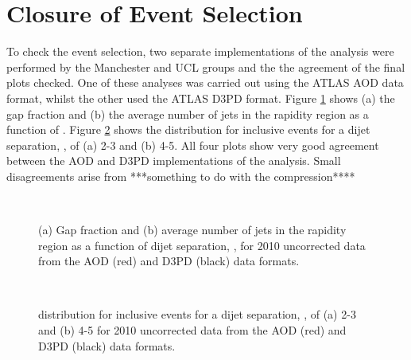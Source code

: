 \section{Closure of Event Selection}
\label{sec:GBJ2:AODD3PD}

To check the event selection, two separate implementations of the analysis were performed by the Manchester and UCL groups and the the agreement of the final plots checked.
One of these analyses was carried out using the ATLAS AOD data format, whilst the other used the ATLAS D3PD format.
Figure \ref{GBJ2:AODD3PD:gap_njet} shows (a) the  gap fraction and (b) the  average number of jets in the rapidity region as a function of \dy{}.
Figure \ref{GBJ2:AODD3PD:dphi} shows the \dphi{} distribution for inclusive events for a dijet separation, \dy{}, of (a) 2-3 and (b) 4-5. 
All four plots show very good agreement between the AOD and D3PD implementations of the analysis.
Small disagreements arise from ***something to do with the compression****


\begin{figure}
\centering
\mbox{
              \quad
              \quad
                              }
\caption[]{
(a) Gap fraction and (b) average number of jets in the rapidity region as a function of dijet separation, \dy{}, for 2010 uncorrected data from the AOD (red) and D3PD (black) data formats.
\label{GBJ2:AODD3PD:gap_njet}}
\end{figure}


\begin{figure}
\centering
\mbox{
              \quad
              \quad
                              }
\caption[]{
\dphi{} distribution for inclusive events for a dijet separation, \dy{}, of (a) 2-3 and (b) 4-5 for 2010 uncorrected data from the AOD (red) and D3PD (black) data formats.
\label{GBJ2:AODD3PD:dphi}}
\end{figure}


